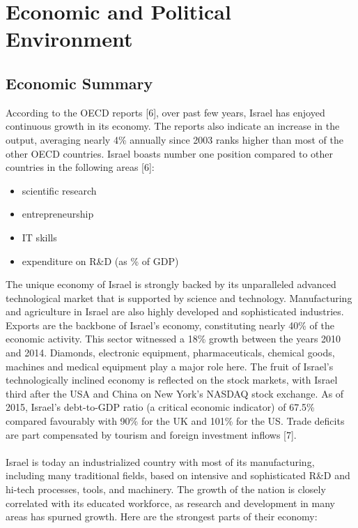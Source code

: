 \documentclass[10pt]{article}
\begin{document}
\section{Economic and Political Environment}

\subsection{Economic Summary}
According to the OECD reports [6], over past few years, Israel has enjoyed continuous growth in its economy. The reports also indicate an increase in the output, averaging nearly 4\% annually since 2003 ranks higher than most of the other OECD countries. Israel boasts number one position compared to other countries in the following areas [6]:
\begin{itemize}
	\item scientific research
	\item entrepreneurship
	\item IT skills
	\item expenditure on R\&D (as \% of GDP)
\end{itemize}

The unique economy of Israel is strongly backed by its unparalleled advanced technological market that is supported by science and technology. Manufacturing and agriculture in Israel are also highly developed and sophisticated industries. Exports are the backbone of Israel's economy, constituting nearly 40\% of the economic activity. This sector witnessed a 18\% growth between the years 2010 and 2014. Diamonds, electronic equipment, pharmaceuticals, chemical goods, machines and medical equipment play a major role here. The fruit of Israel's technologically inclined economy is reflected on the stock markets, with Israel third after the USA and China on New York's NASDAQ stock exchange. As of 2015, Israel's debt-to-GDP ratio (a critical economic indicator) of 67.5\% compared favourably with 90\% for the UK and 101\% for the US. Trade deficits are part compensated by tourism and foreign investment inflows [7].
\\
\\
Israel is today an industrialized country with most of its manufacturing, including many traditional fields, based on intensive and sophisticated R\&D and hi-tech processes, tools, and machinery. The growth of the nation is closely correlated with its educated workforce, as research and development in many areas has spurned growth. Here are the strongest parts of their economy:
\end{document}
